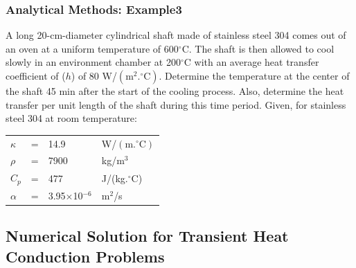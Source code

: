 \documentclass[10pt,compress]{beamer}
\begin{document}
\begin{frame}
 \frametitle{Analytical Methods: Example3}
A long 20-cm-diameter cylindrical shaft made of stainless steel 304 comes out of an oven at a uniform temperature of 600$^{\circ}$C. The shaft is then allowed to cool slowly in an environment chamber at 200$^{\circ}$C with an average heat transfer coefficient of ($h$) of 80 W/$\left(\text{m}^{2}.^{\circ}\text{C}\right)$. Determine the temperature at the center of the shaft 45 min after the start of the cooling process. Also, determine the heat transfer per unit length of the shaft during this time period. Given, for stainless steel 304 at room temperature: \\
\begin{tabular}{l c l l}
$\kappa$ & = & 14.9 & W/$\left(\text{m.}^{\circ}\text{C}\right)$ \\
$\rho$   & = & 7900 & kg/m$^{3}$ \\
$C_{p}$   & = & 477 & J/(kg.$^{\circ}$C) \\
$\alpha$ & = & 3.95$\times$10$^{-6}$ & m$^{2}$/s 
\end{tabular}

\end{frame}


\subsection{Numerical Solution for Transient Heat Conduction Problems}
\end{document}
